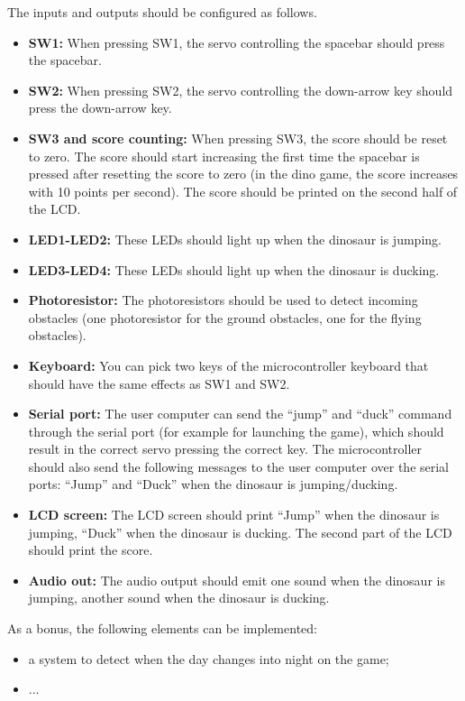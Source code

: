 The inputs and outputs should be configured as follows. 
\begin{itemize}
	\item \textbf{SW1: } When pressing SW1, the servo controlling the spacebar should press the spacebar. 
	\item \textbf{SW2: } When pressing SW2, the servo controlling the down-arrow key should press the down-arrow key. 
	\item \textbf{SW3 and score counting: } When pressing SW3, the score should be reset to zero. The score should start increasing the first time the spacebar is pressed after resetting the score to zero (in the dino game, the score increases with 10 points per second). The score should be printed on the second half of the LCD. 
	\item \textbf{LED1-LED2: } These LEDs should light up when the dinosaur is jumping. 
	\item \textbf{LED3-LED4: } These LEDs should light up when the dinosaur is ducking. 
	\item \textbf{Photoresistor: } The photoresistors should be used to detect incoming obstacles (one photoresistor for the ground obstacles, one for the flying obstacles). 
	\item \textbf{Keyboard: } You can pick two keys of the microcontroller keyboard that should have the same effects as SW1 and SW2. 
	\item \textbf{Serial port: } The user computer can send the ``jump'' and ``duck'' command through the serial port (for example for launching the game), which should result in the correct servo pressing the correct key. The microcontroller should also send the following messages to the user computer over the serial ports: ``Jump'' and ``Duck'' when the dinosaur is jumping/ducking. 
	\item \textbf{LCD screen: } The LCD screen should print ``Jump'' when the dinosaur is jumping, ``Duck'' when the dinosaur is ducking. The second part of the LCD should print the score. 
	\item \textbf{Audio out: } The audio output should emit one sound when the dinosaur is jumping, another sound when the dinosaur is ducking. 
\end{itemize}

As a bonus, the following elements can be implemented: 
\begin{itemize}
	\item a system to detect when the day changes into night on the game; 
	\item ...
\end{itemize}









